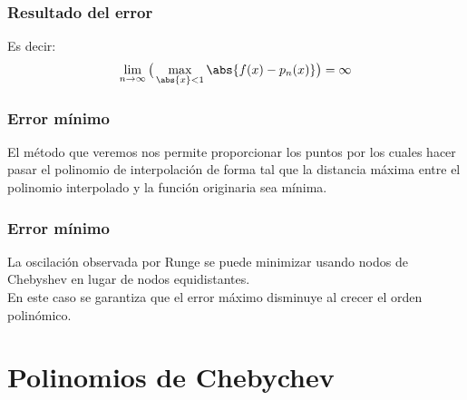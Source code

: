 \begin{frame}
\frametitle{Resultado del error}
Es decir:
\begin{align*}
\lim_{n \to \infty} \big( \max_{\abs{x} < 1} \abs{f(x) - p_{n}(x)} \big) = \infty
\end{align*}
\end{frame}
\begin{frame}
\frametitle{Error mínimo}
El método que veremos nos permite proporcionar los puntos por los cuales hacer pasar el polinomio de interpolación de forma tal que la distancia máxima entre el polinomio interpolado y la función originaria sea mínima.
\end{frame}
\begin{frame}
\frametitle{Error mínimo}
La oscilación observada por Runge se puede minimizar usando nodos de Chebyshev en lugar de nodos equidistantes.
\\
\bigskip
\pause
En este caso se garantiza que el error máximo disminuye al crecer el orden polinómico.
\end{frame}
\section{Polinomios de Chebychev}
